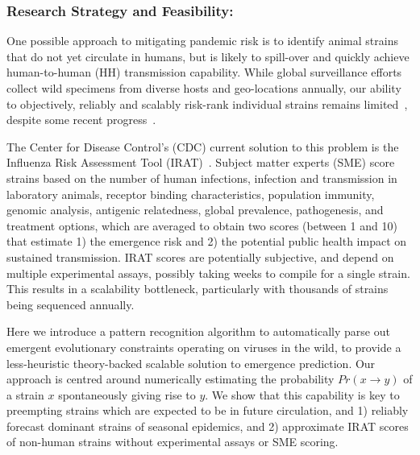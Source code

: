 \documentclass[onecolumn, compsoc,12pt]{IEEEtran}
\begin{document}
\subsubsection*{Research Strategy and Feasibility:} %

One possible approach to mitigating pandemic risk is to identify  animal strains  that do not yet circulate in humans, but is likely to spill-over and quickly achieve human-to-human (HH) transmission capability. While global surveillance efforts collect wild specimens from diverse hosts and geo-locations annually, our  ability to objectively, reliably and scalably  risk-rank individual strains remains limited~\cite{wille2021accurately}, despite some recent progress~\cite{pulliam2009ability,grewelle2020larger,grange2021ranking}.
 
The Center for Disease Control's (CDC) current solution to this problem is the Influenza Risk Assessment Tool (IRAT)~\cite{Influenz24:online}.  Subject matter experts (SME) 
  score strains based on  the number of  human infections, infection and transmission in laboratory animals, receptor binding characteristics, population immunity, genomic analysis, antigenic relatedness, global prevalence,  pathogenesis, and  treatment options, which are averaged to obtain two scores (between 1 and 10) that  estimate 1) the emergence  risk and 2) the potential public health impact on sustained transmission. IRAT scores  are potentially subjective, and  depend on multiple experimental assays, possibly taking  weeks to compile for a single strain. This results in  a scalability bottleneck, particularly with    thousands of strains being sequenced annually.

Here we introduce a pattern recognition algorithm to automatically parse out emergent evolutionary constraints operating on \infl viruses in the wild, to provide a less-heuristic theory-backed scalable solution to emergence prediction. Our approach is centred around numerically estimating the probability $Pr(x \rightarrow y)$ of a strain $x$ spontaneously giving rise to  $y$. We show that this capability is key to preempting  strains which are expected to be in future circulation, and  1) reliably forecast dominant strains of seasonal epidemics, and 2) approximate IRAT scores of non-human strains without  experimental assays or SME scoring.
\end{document}
